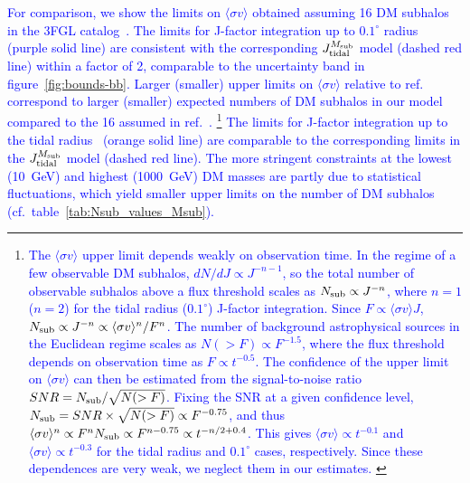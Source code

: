 \documentclass[12pt, a4paper]{article}
\newcommand{\new}[1]{\textcolor{blue}{#1}}
\newcommand{\sigmav}{\langle \sigma v \rangle}
\begin{document}
\new{
For comparison, we show the limits on $\sigmav$ obtained assuming 16 DM subhalos in the 3FGL catalog~\cite{2019JCAP...07..020C}.
The limits for J-factor integration up
to $0.1^\circ$ radius~\cite{2019Galax...7...90C} (purple solid line) are consistent with the corresponding
$J_{\rm tidal}^{M_{\rm sub}}$ model (dashed red line) within a factor of 2, comparable to the uncertainty band in figure~\ref{fig:bounds-bb}.
Larger (smaller) upper limits on $\sigmav$ relative to ref.~\cite{2019Galax...7...90C} correspond to larger (smaller) expected numbers of DM subhalos in our model compared to the 16 assumed in ref.~\cite{2019Galax...7...90C}.}%
\footnote{\new{
The $\sigmav$ upper limit depends weakly on observation time.
In the regime of a few observable DM subhalos, $dN/dJ \propto J^{-n - 1}$, so the total number of observable subhalos above a flux threshold scales as $N_{\rm sub} \propto J^{-n}$,
where $n = 1$ ($n = 2$) for the tidal radius ($0.1^\circ$) J-factor integration.
Since $F \propto \sigmav J$,
$N_{\rm sub} \propto J^{-n} \propto \sigmav^n / F^n$.
The number of background astrophysical sources in the Euclidean regime scales as
$N(> F) \propto F^{-1.5}$, where the flux threshold depends on observation time as $F \propto t^{-0.5}$.
The confidence of the upper limit on $\sigmav$
can then be estimated from the signal-to-noise ratio
$SNR = N_{\rm sub} / \sqrt{N(> F)}$.
Fixing the SNR at a given confidence level, $N_{\rm sub} = SNR \times \sqrt{N(> F)} \propto F^{-0.75}$,
and thus $\sigmav^n \propto F^n N_{\rm sub} \propto F^{n - 0.75} \propto t^{-n/2 + 0.4}$.
This gives $\sigmav \propto t^{-0.1}$ and $\sigmav \propto t^{-0.3}$ for the tidal radius and $0.1^\circ$ cases, respectively. Since these dependences are very weak, we neglect them in our estimates.
}
}
\new{The limits for J-factor integration
up to the tidal radius~\cite{2019JCAP...07..020C} (orange solid line) are comparable to the corresponding limits in the
$J_{\rm tidal}^{M_{\rm sub}}$ model (dashed red line).
The more stringent constraints at the lowest (10~GeV) and highest (1000~GeV) DM masses are partly due to statistical fluctuations, which yield smaller upper limits on the number of DM subhalos (cf.\ table~\ref{tab:Nsub_values_Msub}).
}
\end{document}

